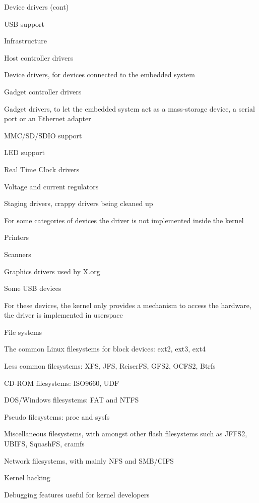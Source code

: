   \startitemize
  \item Device drivers (cont)
    \startitemize
    \item USB support
      \startitemize
      \item Infrastructure
      \item Host controller drivers
      \item Device drivers, for devices connected to the embedded system
      \item Gadget controller drivers
      \item Gadget drivers, to let the embedded system act as a
        mass-storage device, a serial port or an Ethernet adapter
      \stopitemize
    \item MMC/SD/SDIO support
    \item LED support
    \item Real Time Clock drivers
    \item Voltage and current regulators
    \item Staging drivers, crappy drivers being cleaned up
    \stopitemize
  \stopitemize

  \startitemize
  \item For some categories of devices the driver is not implemented
    inside the kernel
    \startitemize
    \item Printers
    \item Scanners
    \item Graphics drivers used by X.org
    \item Some USB devices
    \stopitemize
  \item For these devices, the kernel only provides a mechanism to
    access the hardware, the driver is implemented in userspace
  \stopitemize

  \startitemize
  \item File systems
    \startitemize
    \item The common Linux filesystems for block devices: ext2, ext3,
      ext4
    \item Less common filesystems: XFS, JFS, ReiserFS, GFS2, OCFS2,
      Btrfs
    \item CD-ROM filesystems: ISO9660, UDF
    \item DOS/Windows filesystems: FAT and NTFS
    \item Pseudo filesystems: proc and sysfs
    \item Miscellaneous filesystems, with amongst other flash
      filesystems such as JFFS2, UBIFS, SquashFS, cramfs
    \item Network filesystems, with mainly NFS and SMB/CIFS
    \stopitemize
  \item Kernel hacking
    \startitemize
    \item Debugging features useful for kernel developers
    \stopitemize
  \stopitemize
